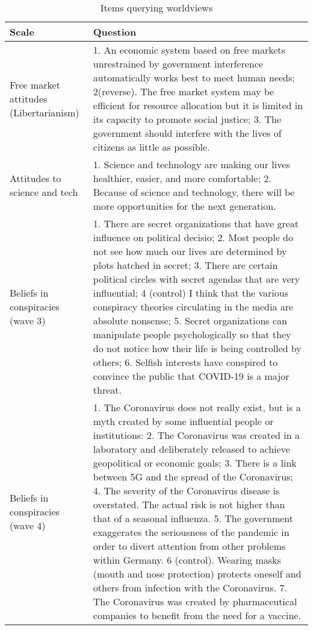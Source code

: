 \begin{table*}

\caption{\label{tab:}Items querying worldviews}
\begin{tabular}[t]{ll}
\toprule
Scale & Question\\
\midrule
Free market attitudes (Libertarianism) & 1. An economic system based on free markets unrestrained by government interference automatically works best to meet human needs; 2(reverse). The free market system may be efficient for resource allocation but it is limited in its capacity to promote social justice; 3. The government should interfere with the lives of citizens as little as possible.\\
Attitudes to science and tech & 1. Science and technology are making our lives healthier, easier, and more comfortable;
  2. Because of science and technology, there will be more opportunities for the next generation.\\
Beliefs in conspiracies (wave 3) & 1. There are secret organizations that have great influence on political decisio;
  2. Most people do not see how much our lives are determined by plots hatched in secret;
  3. There are certain political circles with secret agendas that are very influential;
  4 (control) I think that the various conspiracy theories circulating in the media are absolute nonsense;
  5. Secret organizations can manipulate people psychologically so that they do not notice how their life is being controlled by others;
  6. Selfish interests have conspired to convince the public that COVID-19 is a major threat.\\
Beliefs in conspiracies (wave 4) & 1. The Coronavirus does not really exist, but is a myth created by some influential people or institutions:
2. The Coronavirus was created in a laboratory and deliberately released to achieve geopolitical or economic goals;
3. There is a link between 5G and the spread of the Coronavirus;
4. The severity of the Coronavirus disease is overstated. The actual risk is not higher than that of a seasonal influenza.
5. The government exaggerates the seriousness of the pandemic in order to divert attention from other problems within Germany.
6 (control). Wearing masks (mouth and nose protection) protects oneself and others from infection with the Coronavirus.
7. The Coronavirus was created by pharmaceutical companies to benefit from the need for a vaccine.\\
\bottomrule
\end{tabular}
\end{table*}
